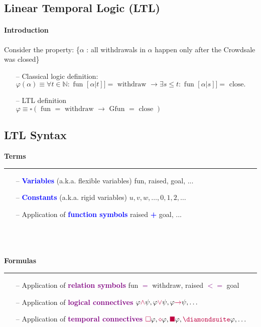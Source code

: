 \subsection{Linear Temporal Logic (LTL)}
\paragraph{Introduction}
Consider the property:
\{$\alpha$ : all withdrawals in $\alpha$ happen only after the Crowdsale was closed\}
\begin{enumerate}
   \item[--] Classical logic definition:\\
        $\varphi(\alpha) \equiv \forall t \in \mathbb{N}: \text { fun }[\alpha | t]]=\text { withdraw } \rightarrow \exists s \leqslant t: \text { fun }[\alpha | s]]=\text { close. }$
    \item[--] LTL definition \\
    $\varphi \equiv \square(\text { fun }=\text { withdraw } \rightarrow \text { Gfun }=\text { close })$
\end{enumerate}{}
\subsection{LTL Syntax}

\begin{multicols}{2}
 \textbf{Terms}  \\ \rule{\linewidth}{0.4pt} \begin{enumerate}
    \item[--] \textbf{\textcolor{blue}{Variables}} (a.k.a. flexible variables) fun, raised, goal, ...
    \item[--] \textbf{\textcolor{blue}{Constants}} (a.k.a. rigid variables) $u, v, w, \ldots, 0,1,2, \ldots$
    \item[--] Application of \textbf{\textcolor{blue}{function symbols}} raised \textbf{\textcolor{blue}{+}} goal, ...
 \end{enumerate}{}
 \\
 \columnbreak 
 \\ \\ \textbf{Formulas}  \\ \rule{\linewidth}{0.4pt}  
 \begin{enumerate}
    \item[--] Application of \textbf{\textcolor{purple}{relation symbols}} fun \textcolor{purple}{$=$} withdraw, raised \textcolor{purple}{$<=$} goal
    \item[--] Application of \textbf{\textcolor{purple}{logical connectives}} $\varphi \textcolor{purple}{\wedge} \psi, \varphi \textcolor{purple}{\vee} \psi, \varphi \textcolor{purple}{\rightarrow} \psi, \ldots$
    \item[--] Application of \textbf{\textcolor{purple}{temporal connectives}}
        $\textcolor{purple}{\square} \varphi, \textcolor{purple}{\diamond}\varphi, \textcolor{purple}{\blacksquare } \varphi, \textcolor{purple}{\diamondsuite} \varphi, \ldots$
 \end{enumerate}{}
 \end{multicols}
 
